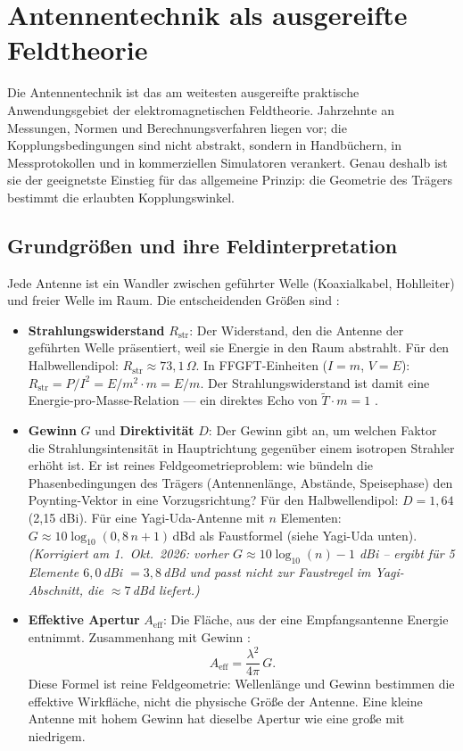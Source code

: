 \section{Antennentechnik als ausgereifte Feldtheorie}

Die Antennentechnik ist das am weitesten ausgereifte praktische Anwendungsgebiet
der elektromagnetischen Feldtheorie. Jahrzehnte an Messungen, Normen und
Berechnungsverfahren liegen vor; die Kopplungsbedingungen sind nicht abstrakt,
sondern in Handbüchern, in Messprotokollen und in kommerziellen Simulatoren
verankert. Genau deshalb ist sie der geeignetste Einstieg für das allgemeine
Prinzip: die Geometrie des Trägers bestimmt die erlaubten Kopplungswinkel.

\subsection*{Grundgrößen und ihre Feldinterpretation}

Jede Antenne ist ein Wandler zwischen geführter Welle (Koaxialkabel, Hohlleiter)
und freier Welle im Raum. Die entscheidenden Größen sind \EM:

\begin{itemize}[nosep]
\item \textbf{Strahlungswiderstand} $R_\mathrm{str}$: Der Widerstand, den die
  Antenne der geführten Welle präsentiert, weil sie Energie in den Raum abstrahlt.
  Für den Halbwellendipol: $R_\mathrm{str} \approx 73{,}1\,\Omega$.
  In FFGFT-Einheiten ($I=m$, $V=E$): $R_\mathrm{str} = P/I^2 = E/m^2 \cdot m = E/m$.
  Der Strahlungswiderstand ist damit eine Energie-pro-Masse-Relation --- ein
  direktes Echo von $\tilde{T}\cdot m=1$ \SM.

\item \textbf{Gewinn} $G$ und \textbf{Direktivität} $D$: Der Gewinn gibt an, um
  welchen Faktor die Strahlungsintensität in Hauptrichtung gegenüber einem
  isotropen Strahler erhöht ist. Er ist reines Feldgeometrieproblem: wie bündeln
  die Phasenbedingungen des Trägers (Antennenlänge, Abstände, Speisephase) den
  Poynting-Vektor in eine Vorzugsrichtung? Für den Halbwellendipol:
  $D = 1{,}64$ (2,15 dBi). Für eine Yagi-Uda-Antenne mit $n$ Elementen:
  $G \approx 10\log_{10}(0{,}8\,n+1)$\,dBd als Faustformel (siehe Yagi-Uda unten).
  \textit{(Korrigiert am 1.~Okt.~2026: vorher $G \approx 10\log_{10}(n) - 1$ dBi -- ergibt für 5 Elemente $6{,}0$\,dBi $=3{,}8$\,dBd und passt nicht zur Faustregel im Yagi-Abschnitt, die $\approx7$\,dBd liefert.)}

\item \textbf{Effektive Apertur} $A_\mathrm{eff}$: Die Fläche, aus der eine
  Empfangsantenne Energie entnimmt. Zusammenhang mit Gewinn \EM:
  \[
    A_\mathrm{eff} = \frac{\lambda^2}{4\pi}\,G.
  \]
  Diese Formel ist reine Feldgeometrie: Wellenlänge und Gewinn bestimmen die
  effektive Wirkfläche, nicht die physische Größe der Antenne. Eine kleine
  Antenne mit hohem Gewinn hat dieselbe Apertur wie eine große mit niedrigem.
\end{itemize}

